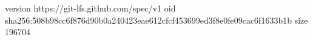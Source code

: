 version https://git-lfs.github.com/spec/v1
oid sha256:508b98cc6f876d90b0a240423eae612cfcf453699ed3f8e0fe09cac6f1633b1b
size 196704

